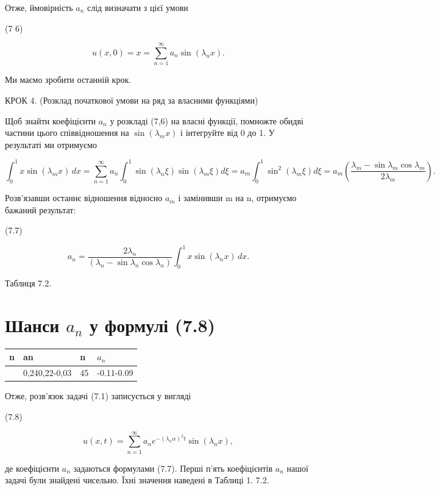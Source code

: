 \documentclass[
  ukrainian,
]{article}
\newcounter{none} %
\begin{document}
Отже, ймовірність \(a_n\) слід визначати з цієї умови

(7 6)

\[
u(x, 0) = x = \sum_{n=1}^{\infty} a_n \sin(\lambda_n x).
\]

Ми маємо зробити останній крок.

КРОК 4. (Розклад початкової умови на ряд за власними функціями)

Щоб знайти коефіцієнти \(a_n\) у розкладі (7,6) на власні функції,
помножте обидві частини цього співвідношення на \(\sin(\lambda_m x)\) і
інтегруйте від 0 до 1. У результаті ми отримуємо

\[
\int_{0}^{1} x \sin(\lambda_m x)\,dx = \sum_{n=1}^{\infty} a_{n} \int_{0}^{1} \sin(\lambda_{n} \xi) \sin(\lambda_{m} \xi) d\xi
= a_{m} \int_{0}^{1} \sin^{2}(\lambda_{m} \xi) d\xi
= a_{m} \left( \frac{\lambda_{m} - \sin \lambda_{m} \cos \lambda_{m}}{2\lambda_{m}} \right).
\]

Розв'язавши останнє відношення відносно \(a_m\) і замінивши m на n,
отримуємо бажаний результат:

(7.7)

\[
a_n = \frac{2\lambda_n}{(\lambda_n - \sin \lambda_n \cos \lambda_n)} \int_0^1 x \sin(\lambda_n x)\,dx.
\]

Таблиця 7.2.

\section{\texorpdfstring{Шанси \(a_n\) у формулі
(7.8)}{Шанси a\_n у формулі (7.8)}}\label{ux448ux430ux43dux441ux438-a_n-ux443-ux444ux43eux440ux43cux443ux43bux456-7.8}

{\def\LTcaptype{none} %
\begin{longtable}[]{@{}llll@{}}
\toprule\noalign{}
n & an & n & \(a_n\) \\
\midrule\noalign{}
\endhead
\bottomrule\noalign{}
\endlastfoot
123 & 0,240,22-0,03 & 45 & -0.11-0.09  \\
\end{longtable}
}

Отже, розв'язок задачі (7.1) записується у вигляді

(7.8)

\[
u(x, t) = \sum_{n=1}^{\infty} a_n e^{-(\lambda_n \alpha)^2 t} \sin(\lambda_n x),
\]

де коефіцієнти \(a_n\) задаються формулами (7.7). Перші п'ять
коефіцієнтів \(a_n\) нашої задачі були знайдені чисельно. Їхні значення
наведені в Таблиці 1. 7.2.
\end{document}

